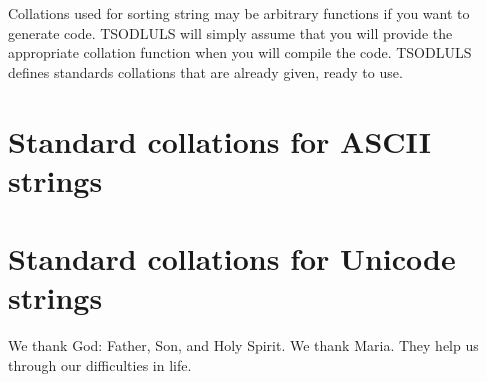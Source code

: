 \documentclass[a4paper,11pt]{report}
\begin{document}
Collations used for sorting string may be arbitrary functions if you want to generate code.
TSODLULS will simply assume that you will provide the appropriate collation function when you will compile the code.
TSODLULS defines standards collations that are already given, ready to use.

\section{Standard collations for ASCII strings}


\section{Standard collations for Unicode strings}


\label{section:acknowledgements}

We thank God: Father, Son, and Holy Spirit. We thank Maria.
They help us through our difficulties in life.


\nocite{*}


\label{section:bibliography}
\end{document}
